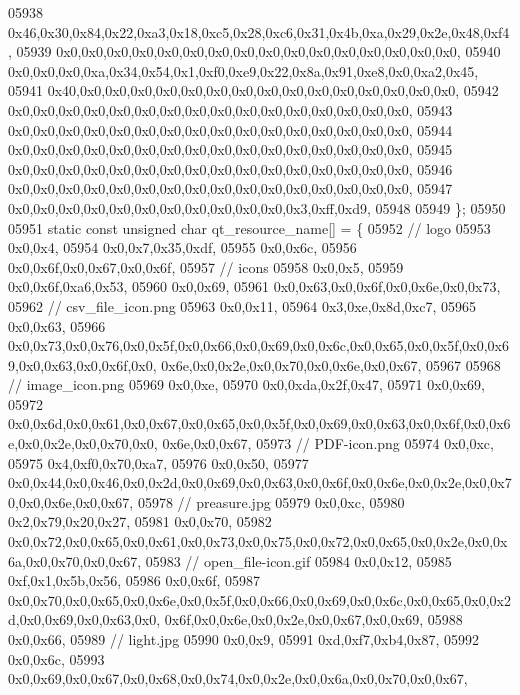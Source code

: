 \begin{DoxyCode}
05938   0x46,0x30,0x84,0x22,0xa3,0x18,0xc5,0x28,0xc6,0x31,0x4b,0xa,0x29,0x2e,0x48,0xf4,
05939   0x0,0x0,0x0,0x0,0x0,0x0,0x0,0x0,0x0,0x0,0x0,0x0,0x0,0x0,0x0,0x0,
05940   0x0,0x0,0x0,0xa,0x34,0x54,0x1,0xf0,0xe9,0x22,0x8a,0x91,0xe8,0x0,0xa2,0x45,
05941   0x40,0x0,0x0,0x0,0x0,0x0,0x0,0x0,0x0,0x0,0x0,0x0,0x0,0x0,0x0,0x0,
05942   0x0,0x0,0x0,0x0,0x0,0x0,0x0,0x0,0x0,0x0,0x0,0x0,0x0,0x0,0x0,0x0,
05943   0x0,0x0,0x0,0x0,0x0,0x0,0x0,0x0,0x0,0x0,0x0,0x0,0x0,0x0,0x0,0x0,
05944   0x0,0x0,0x0,0x0,0x0,0x0,0x0,0x0,0x0,0x0,0x0,0x0,0x0,0x0,0x0,0x0,
05945   0x0,0x0,0x0,0x0,0x0,0x0,0x0,0x0,0x0,0x0,0x0,0x0,0x0,0x0,0x0,0x0,
05946   0x0,0x0,0x0,0x0,0x0,0x0,0x0,0x0,0x0,0x0,0x0,0x0,0x0,0x0,0x0,0x0,
05947   0x0,0x0,0x0,0x0,0x0,0x0,0x0,0x0,0x0,0x0,0x0,0x3,0xff,0xd9,
05948   
05949 \};
05950 
05951 \textcolor{keyword}{static} \textcolor{keyword}{const} \textcolor{keywordtype}{unsigned} \textcolor{keywordtype}{char} qt\_resource\_name[] = \{
05952   \textcolor{comment}{// logo}
05953   0x0,0x4,
05954   0x0,0x7,0x35,0xdf,
05955   0x0,0x6c,
05956   0x0,0x6f,0x0,0x67,0x0,0x6f,
05957     \textcolor{comment}{// icons}
05958   0x0,0x5,
05959   0x0,0x6f,0xa6,0x53,
05960   0x0,0x69,
05961   0x0,0x63,0x0,0x6f,0x0,0x6e,0x0,0x73,
05962     \textcolor{comment}{// csv\_file\_icon.png}
05963   0x0,0x11,
05964   0x3,0xe,0x8d,0xc7,
05965   0x0,0x63,
05966   0x0,0x73,0x0,0x76,0x0,0x5f,0x0,0x66,0x0,0x69,0x0,0x6c,0x0,0x65,0x0,0x5f,0x0,0x69,0x0,0x63,0x0,0x6f,0x0,
      0x6e,0x0,0x2e,0x0,0x70,0x0,0x6e,0x0,0x67,
05967   
05968     \textcolor{comment}{// image\_icon.png}
05969   0x0,0xe,
05970   0x0,0xda,0x2f,0x47,
05971   0x0,0x69,
05972   0x0,0x6d,0x0,0x61,0x0,0x67,0x0,0x65,0x0,0x5f,0x0,0x69,0x0,0x63,0x0,0x6f,0x0,0x6e,0x0,0x2e,0x0,0x70,0x0,
      0x6e,0x0,0x67,
05973     \textcolor{comment}{// PDF-icon.png}
05974   0x0,0xc,
05975   0x4,0xf0,0x70,0xa7,
05976   0x0,0x50,
05977   0x0,0x44,0x0,0x46,0x0,0x2d,0x0,0x69,0x0,0x63,0x0,0x6f,0x0,0x6e,0x0,0x2e,0x0,0x70,0x0,0x6e,0x0,0x67,
05978     \textcolor{comment}{// preasure.jpg}
05979   0x0,0xc,
05980   0x2,0x79,0x20,0x27,
05981   0x0,0x70,
05982   0x0,0x72,0x0,0x65,0x0,0x61,0x0,0x73,0x0,0x75,0x0,0x72,0x0,0x65,0x0,0x2e,0x0,0x6a,0x0,0x70,0x0,0x67,
05983     \textcolor{comment}{// open\_file-icon.gif}
05984   0x0,0x12,
05985   0xf,0x1,0x5b,0x56,
05986   0x0,0x6f,
05987   0x0,0x70,0x0,0x65,0x0,0x6e,0x0,0x5f,0x0,0x66,0x0,0x69,0x0,0x6c,0x0,0x65,0x0,0x2d,0x0,0x69,0x0,0x63,0x0,
      0x6f,0x0,0x6e,0x0,0x2e,0x0,0x67,0x0,0x69,
05988   0x0,0x66,
05989     \textcolor{comment}{// light.jpg}
05990   0x0,0x9,
05991   0xd,0xf7,0xb4,0x87,
05992   0x0,0x6c,
05993   0x0,0x69,0x0,0x67,0x0,0x68,0x0,0x74,0x0,0x2e,0x0,0x6a,0x0,0x70,0x0,0x67,

\end{DoxyCode}
